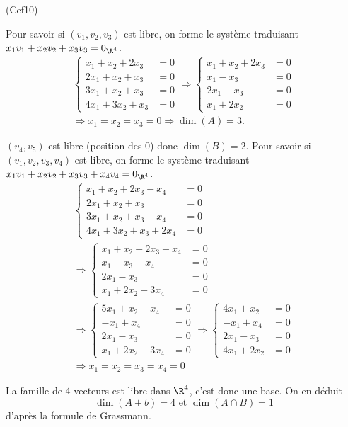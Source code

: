\begin{tiny}(Cef10)\end{tiny} Pour savoir si $(v_1,v_2,v_3)$ est libre, on forme le système traduisant $x_1 v_1 + x_2v_2 + x_3 v_3 = 0_{\R^4}$.
\begin{multline*}
 \left\lbrace
 \begin{aligned}
  x_1 + x_2 + 2x_3 &= 0 \\
  2x_1 + x_2 + x_3 &= 0 \\
  3x_1 + x_2 + x_3 &= 0 \\
  4x_1 + 3x_2 + x_3 &= 0
 \end{aligned}
\right. 
\Rightarrow
 \left\lbrace
 \begin{aligned}
  x_1 + x_2 + 2x_3 &= 0 \\
  x_1  - x_3 &= 0 \\
  2x_1 - x_3 &= 0 \\
  x_1 + 2x_2  &= 0
 \end{aligned}
\right. \\
\Rightarrow x_1 = x_2 = x_3 = 0
\Rightarrow \dim(A) = 3.
\end{multline*}

$(v_4,v_5)$ est libre (position des $0$) donc $\dim(B) = 2$.\newline
Pour savoir si $(v_1,v_2,v_3,v_4)$ est libre, on forme le système traduisant $x_1 v_1 + x_2v_2 + x_3 v_3 + x_4v_4= 0_{\R^4}$.
\begin{multline*}
 \left\lbrace
 \begin{aligned}
  x_1 + x_2 + 2x_3 - x_4 &= 0 \\
  2x_1 + x_2 + x_3 &= 0 \\
  3x_1 + x_2 + x_3 -x_4 &= 0 \\
  4x_1 + 3x_2 + x_3 + 2x_4 &= 0
 \end{aligned}
\right. \\
\Rightarrow
 \left\lbrace
 \begin{aligned}
  x_1 + x_2 + 2x_3 - x_4 &= 0 \\
  x_1  - x_3 + x_4 &= 0 \\
  2x_1 - x_3 &= 0 \\
  x_1 + 2x_2 + 3x_4 &= 0
 \end{aligned}
\right. \\
\Rightarrow
 \left\lbrace
 \begin{aligned}
  5x_1 + x_2  - x_4 &= 0 \\
  -x_1   + x_4 &= 0 \\
  2x_1 - x_3 &= 0 \\
  x_1 + 2x_2 + 3x_4 &= 0
 \end{aligned}
\right. 
\Rightarrow
 \left\lbrace
 \begin{aligned}
  4x_1 + x_2   &= 0 \\
  -x_1   + x_4 &= 0 \\
  2x_1 - x_3 &= 0 \\
  4x_1 + 2x_2 &= 0
 \end{aligned}
\right. \\
\Rightarrow x_1 = x_2 = x_3 = x_4 = 0
\end{multline*}

La famille de 4 vecteurs est libre dans $\R^4$, c'est donc une base. On en déduit
\[
 \dim(A+b) = 4 \text{ et } \dim(A \cap B) = 1
\]
d'après la formule de Grassmann.
